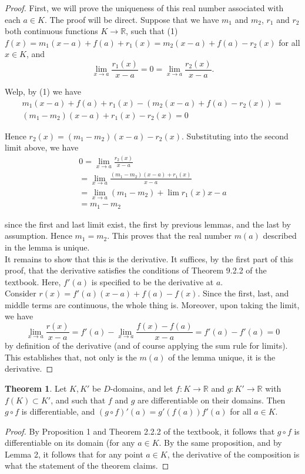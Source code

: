 \documentclass[11pt]{article}
\newcommand{\R}{\mathbb{R}}
\theoremstyle{definition}
\newtheorem{theorem}{Theorem}
\begin{document}
\begin{proof}
First, we will prove the uniqueness of this real number associated with each $a\in K$. The proof will be direct. Suppose that we have $m_1$ and $m_2$, $r_1$ and $r_2$ both continuous functions $K\to \R$, such that (1) $f(x) = m_1(x-a) + f(a) + r_1(x) = m_2(x-a) + f(a) - r_2(x)$ for all $x\in K$, and 
\[
\lim_{x\to a}\frac{r_1(x)}{x-a} = 0 = \lim_{x\to a}\frac{r_2(x)}{x-a}.
\]

Welp, by (1) we have 
\begin{align}
m_1(x-a) + f(a) + r_1(x) - (m_2(x-a) + f(a) - r_2(x)) = \\
(m_1 - m_2)(x-a) + r_1(x) - r_2(x) = 0
\end{align}

Hence $r_2(x) = (m_1 - m_2)(x-a) - r_2(x)$. Substituting into the second limit above, we have
\begin{align}
0 = \lim_{x\to a} \frac{r_2(x)}{x-a}  \\
=\lim_{x\to a}\frac{(m_1 - m_2)(x-a) + r_1(x)}{x-a}\\
= \lim_{x\to a}(m_1 - m_2) + \lim{r_1(x)}{x-a}\\
= m_1 - m_2
\end{align}

since the first and last limit exist, the first by previous lemmas, and the last by assumption. Hence $m_1 = m_2$. This proves that the real number $m(a)$ described in the lemma is unique.\\

It remains to show that this is the derivative. It suffices, by the first part of this proof, that the derivative satisfies the conditions of Theorem 9.2.2 of the textbook. Here, $f'(a)$ is specified to be the derivative at $a$.\\

Consider $r(x) = f'(a)(x-a) + f(a) - f(x)$. Since the first, last, and middle terms are continuous, the whole thing is. Moreover, upon taking the limit, we have
\[
\lim_{x\to a}\frac{r(x)}{x-a} = f'(a) - \lim_{x\to a}\frac{f(x) - f(a)}{x-a} = f'(a) - f'(a) = 0
\]
by definition of the derivative (and of course applying the sum rule for limits). This establishes that, not only is the $m(a)$ of the lemma unique, it is the derivative.

\end{proof}

\begin{theorem}
Let $K,K'$ be $D$-domains, and let $f:K\to \R$ and $g:K'\to \R$ with $f(K)\subset K'$, and such that $f$ and $g$ are differentiable on their domains. Then $g\circ f$ is differentiable, and $(g\circ f)'(a) = g'(f(a))f'(a)$ for all $a\in K$. 
\end{theorem}

\begin{proof} By Proposition 1 and Theorem 2.2.2 of the textbook, it follows that $g\circ f$ is differentiable on its domain (for any $a\in K$. By the same proposition, and by Lemma 2, it follows that for any point $a\in K$, the derivative of the composition is what the statement of the theorem claims.  
\end{proof}
\end{document}
